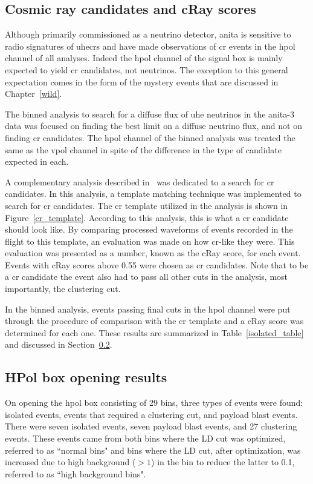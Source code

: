 \subsection{Cosmic ray candidates and cRay scores}

Although primarily commissioned as a neutrino detector, \gls{anita} is sensitive to radio signatures of \gls{uhecrs} and have made observations of \gls{cr} events in the \gls{hpol} channel of all analyses. Indeed the \gls{hpol} channel of the signal box is mainly expected to yield \gls{cr} candidates, not neutrinos. The exception to this general expectation comes in the form of the mystery events that are discussed in Chapter~\ref{wild}. 

The binned analysis to search for a diffuse flux of \gls{uhe} neutrinos in the \gls{anita}-3 data was focused on finding the best limit on a diffuse neutrino flux, and not on finding \gls{cr} candidates. The \gls{hpol} channel of the binned analysis was treated the same as the \gls{vpol} channel in spite of the difference in the type of candidate expected in each. 

A complementary analysis described in~\cite{me2} was dedicated to a search for \gls{cr} candidates. In this analysis, a template matching technique was implemented to search for \gls{cr} candidates. The \gls{cr} template utilized in the analysis is shown in Figure~\ref{cr_template}. According to this analysis, this is what a \gls{cr} candidate should look like. By comparing processed waveforms of events recorded in the flight to this template, an evaluation was made on how \gls{cr}-like they were. This evaluation was presented as a number, known as the cRay score, for each event. Events with cRay scores above 0.55 were chosen as \gls{cr} candidates. Note that to be a \gls{cr} candidate the event also had to pass all other cuts in the analysis, most importantly, the clustering cut. 

In the binned analysis, events passing final cuts in the \gls{hpol} channel were put through the procedure of comparison with the \gls{cr} template and a cRay score was determined for each one. These results are summarized in Table~\ref{isolated_table} and discussed in Section~\ref{hpol_box_open}.  


\subsection{HPol box opening results}
\label{hpol_box_open}

On opening the \gls{hpol} box consisting of 29 bins, three types of events were found: isolated events, events that required a clustering cut, and payload blast events. 
There were seven isolated events, seven payload blast events, and 27 clustering events. These events came from both bins where the LD cut was optimized, referred to as ``normal bins" and bins where the LD cut, after optimization, was increased due to high  background ($>1$) in the bin to reduce the latter to 0.1, referred to as ``high background bins".


